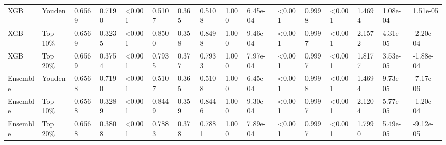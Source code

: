 \documentclass[journal]{IEEEtran}
\begin{document}
\begin{table}[!htbp]
{\begin{tabular}{llllllllllllllll}
XGB & Youden & 0.6569 & 0.7190 & \textless0.001 & 0.5107 & 0.365 & 0.5108 & 1.000 & 6.45e-04 & \textless0.001 & 0.9998 & \textless0.001 & 1.4694 & 1.08e-04 & 1.51e-05 \\
XGB & Top 10\% & 0.6569 & 0.3235 & \textless0.001 & 0.8500 & 0.358 & 0.8498 & 1.000 & 9.46e-04 & \textless0.001 & 0.9997 & \textless0.001 & 2.1572 & 4.31e-05 & -2.20e-04 \\
XGB & Top 20\% & 0.6569 & 0.3754 & \textless0.001 & 0.7935 & 0.377 & 0.7933 & 1.000 & 7.97e-04 & \textless0.001 & 0.9997 & \textless0.001 & 1.8177 & 3.53e-05 & -1.88e-04 \\
Ensemble & Youden & 0.6568 & 0.7190 & \textless0.001 & 0.5107 & 0.365 & 0.5108 & 1.000 & 6.45e-04 & \textless0.001 & 0.9998 & \textless0.001 & 1.4694 & 9.73e-05 & -7.17e-06 \\
Ensemble & Top 10\% & 0.6568 & 0.3289 & \textless0.001 & 0.8449 & 0.359 & 0.8446 & 1.000 & 9.30e-04 & \textless0.001 & 0.9997 & \textless0.001 & 2.1204 & 5.77e-05 & -1.20e-04 \\
Ensemble & Top 20\% & 0.6568 & 0.3808 & \textless0.001 & 0.7883 & 0.378 & 0.7881 & 1.000 & 7.89e-04 & \textless0.001 & 0.9997 & \textless0.001 & 1.7990 & 5.49e-05 & -9.12e-05 \\
\bottomrule\end{tabular}}
\end{table}
\end{document}
